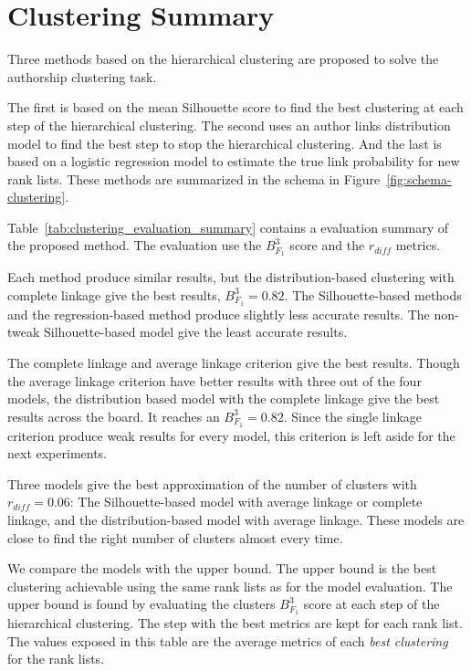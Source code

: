 \section{Clustering Summary}

Three methods based on the hierarchical clustering are proposed to solve the authorship clustering task.

The first is based on the mean Silhouette score to find the best clustering at each step of the hierarchical clustering.
The second uses an author links distribution model to find the best step to stop the hierarchical clustering.
And the last is based on a logistic regression model to estimate the true link probability for new rank lists.
These methods are summarized in the schema in Figure~\ref{fig:schema-clustering}.

Table~\ref{tab:clustering_evaluation_summary} contains a evaluation summary of the proposed method.
The evaluation use the $B^3_{F_1}$ score and the $r_{diff}$ metrics.

Each method produce similar results, but the distribution-based clustering with complete linkage give the best results, $B^3_{F_1} = 0.82$.
The Silhouette-based methods and the regression-based method produce slightly less accurate results.
The non-tweak Silhouette-based model give the least accurate results.

The complete linkage and average linkage criterion give the best results.
Though the average linkage criterion have better results with three out of the four models, the distribution based model with the complete linkage give the best results across the board.
It reaches an $B^3_{F_1} = 0.82$.
Since the single linkage criterion produce weak results for every model, this criterion is left aside for the next experiments.

Three models give the best approximation of the number of clusters with $r_{diff} = 0.06$:
The Silhouette-based model with average linkage or complete linkage, and the distribution-based model with average linkage.
These models are close to find the right number of clusters almost every time.

We compare the models with the upper bound.
The upper bound is the best clustering achievable using the same rank lists as for the model evaluation.
The upper bound is found by evaluating the clusters $B^3_{F_1}$ score at each step of the hierarchical clustering.
The step with the best metrics are kept for each rank list.
The values exposed in this table are the average metrics of each \textit{best clustering} for the rank lists.

